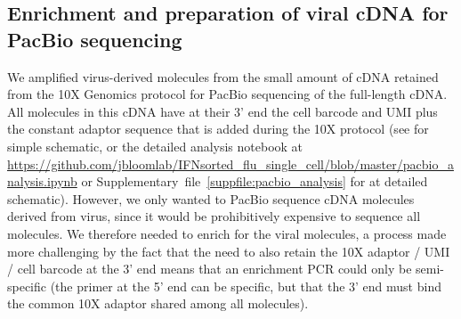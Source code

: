 \documentclass[9pt,lineno]{elife}
\begin{document}
\subsection{Enrichment and preparation of viral cDNA for PacBio sequencing}
We amplified virus-derived molecules from the small amount of cDNA retained from the 10X Genomics protocol for PacBio sequencing of the full-length cDNA.
All molecules in this cDNA have at their 3' end the cell barcode and UMI plus the constant adaptor sequence that is added during the 10X protocol (see  for simple schematic, or the detailed analysis notebook at \url{https://github.com/jbloomlab/IFNsorted_flu_single_cell/blob/master/pacbio_analysis.ipynb} or Supplementary~file~\ref{suppfile:pacbio_analysis} for at detailed schematic).
However, we only wanted to PacBio sequence cDNA molecules derived from virus, since it would be prohibitively expensive to sequence all molecules.
We therefore needed to enrich for the viral molecules, a process made more challenging by the fact that the need to also retain the 10X adaptor / UMI / cell barcode at the 3' end means that an enrichment PCR could only be semi-specific (the primer at the 5' end can be specific, but that the 3' end must bind the common 10X adaptor shared among all molecules).
\end{document}
